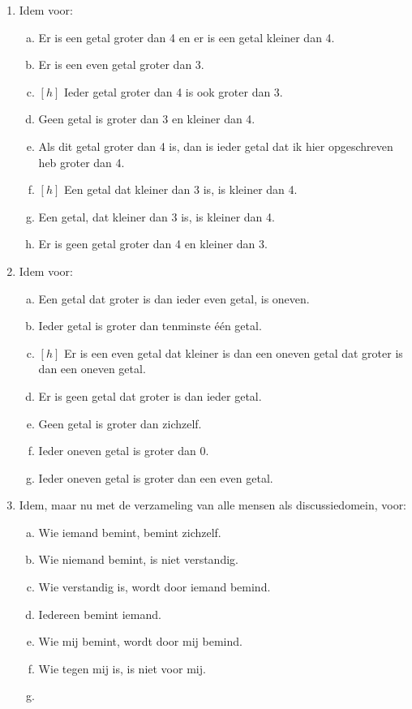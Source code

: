 \begin{enumerate}[\thesection.1]
\item
 Idem voor:
\begin{enumerate}[a.]
\item 
 Er is een getal groter dan 4 en er is een getal kleiner dan 4.
\item
Er is een even getal groter dan 3.
\item $[h]$ 
Ieder getal groter dan 4 is ook groter dan 3.
\item
Geen getal is groter dan 3 en kleiner dan 4.
\item
Als dit getal groter dan 4 is, dan is ieder getal dat ik hier
opgeschreven heb groter dan 4.
\item $[h]$ 
 Een getal dat kleiner dan 3 is, is kleiner dan 4.
\item
 Een getal, dat kleiner dan 3 is, is kleiner dan 4.
\item
 Er is geen getal groter dan 4 en kleiner dan 3.
 \end{enumerate}
%
\item
Idem voor:
\begin{enumerate}[a.]
\item
 Een getal dat groter is dan ieder even getal, is oneven.
\item
Ieder getal is groter dan tenminste \'e\'en getal.
\item $[h]$ 
 Er is een even getal dat kleiner is dan een oneven getal dat
groter is dan een oneven getal.
\item
 Er is geen getal dat groter is dan ieder getal.
\item
 Geen getal is groter dan zichzelf.
\item
 Ieder oneven getal is groter dan 0.
\item
 Ieder oneven getal is groter dan een even getal.
\end{enumerate}
%
\item
 Idem, maar nu met de verzameling van alle mensen als
discussiedomein, voor:
\begin{enumerate}[a.]
\item
 Wie iemand bemint, bemint zichzelf.
\item
 Wie niemand bemint, is niet verstandig.
\item
 Wie verstandig is, wordt door iemand bemind.
\item
 Iedereen bemint iemand.
\item
 Wie mij bemint, wordt door mij bemind.
\item
 Wie tegen mij is, is niet voor mij.
\item

\end{enumerate}
\end{enumerate}
